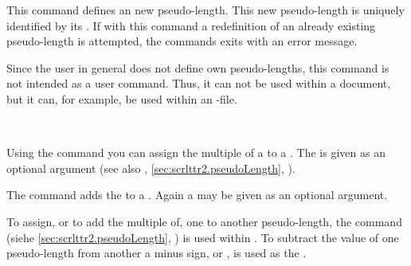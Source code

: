 \begin{Declaration}
\end{Declaration}
%
This command defines an new pseudo-length. This new pseudo-length is
uniquely identified by its . If with this command a
redefinition of an already existing pseudo-length is attempted, the
commands exits with an error message.

Since the user in general does not define own pseudo-lengths, this command is
not intended as a user command. Thus, it can not be used within a document,
but it can, for example, be used within an
-file.%
%
%

\begin{Declaration}
    \\
\end{Declaration}
%
%
Using the command  you can assign the multiple of a
 to a . The  is given as an
optional argument (see also ,
\autoref{sec:scrlttr2.pseudoLength},
).

The command  adds the  to a
. Again a  may be given as an optional
argument.

To assign, or to add the multiple of, one  to another
pseudo-length, the command  (siehe
\autoref{sec:scrlttr2.pseudoLength},
) is used within .  To
subtract the value of one pseudo-length from another  a
minus sign, or , is used as the .

